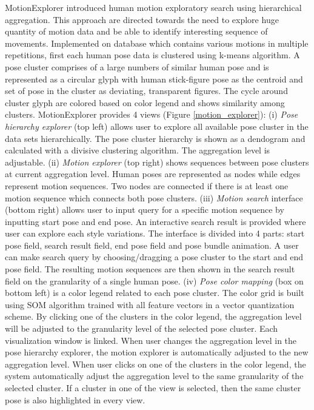 MotionExplorer\cite{bernard2013} introduced human motion exploratory search using hierarchical aggregation. This approach are directed towards the need to explore huge quantity of motion data and be able to identify interesting sequence of movements. Implemented on database which contains various motions in multiple repetitions, first each human pose data is clustered using k-means algorithm. A pose cluster comprises of a large numbers of similar human pose and is represented as a circular glyph with human stick-figure pose as the centroid and set of pose in the cluster as deviating, transparent figures. The cycle around cluster glyph are colored based on color legend and shows similarity among clusters. MotionExplorer provides 4 views (Figure \ref{motion_explorer}): (i) \textit{Pose hierarchy explorer} (top left) allows user to explore all available pose cluster in the data sets hierarchically. The pose cluster hierarchy is shown as a dendogram and calculated with a divisive clustering algorithm. The aggregation level is adjustable. (ii) \textit{Motion explorer} (top right) shows sequences between pose clusters at current aggregation level. Human poses are represented as nodes while edges represent motion sequences. Two nodes are connected if there is at least one motion sequence which connects both pose clusters. (iii) \textit{Motion search} interface (bottom right) allows user to input query for a specific motion sequence by inputting start pose and end pose. An interactive search result is provided where user can explore each style variations. The interface is divided into 4 parts: start pose field, search result field, end pose field and pose bundle animation. A user can make search query by choosing/dragging a pose cluster to the start and end pose field. The resulting motion sequences are then shown in the search result field on the granularity of a single human pose. (iv) \textit{Pose color mapping} (box on bottom left) is a color legend related to each pose cluster. The color grid is built using SOM algorithm trained with all feature vectors in a vector quantization scheme. By clicking one of the clusters in the color legend, the aggregation level will be adjusted to the granularity level of the selected pose cluster. Each visualization window is linked. When user changes the aggregation level in the pose hierarchy explorer, the motion explorer is automatically adjusted to the new aggregation level. When user clicks on one of the clusters in the color legend, the system automatically adjust the aggregation level to the same granularity of the selected cluster. If a cluster in one of the view is selected, then the same cluster pose is also highlighted in every view. 

